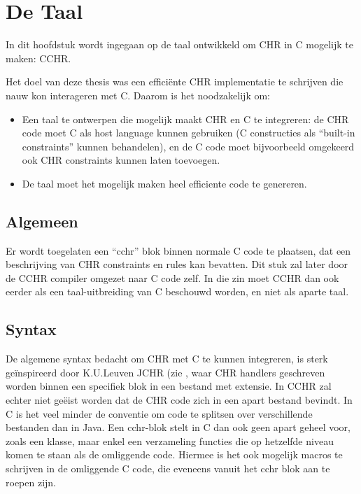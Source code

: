 \chapter{De Taal} \label{chap:taal}

In dit hoofdstuk wordt ingegaan op de taal ontwikkeld om CHR in C mogelijk te maken: CCHR.

Het doel van deze thesis was een effici\"ente CHR implementatie te schrijven die nauw kon interageren met C. Daarom is het noodzakelijk om: \begin{itemize}
  \item Een taal te ontwerpen die mogelijk maakt CHR en C te integreren: de CHR code moet C
        als host language kunnen gebruiken (C constructies als ``built-in constraints'' kunnen
	behandelen), en de C code moet bijvoorbeeld omgekeerd ook CHR constraints kunnen laten toevoegen.
  \item De taal moet het mogelijk maken heel efficiente code te genereren.
\end{itemize}

\section{Algemeen} \label{sec:taal-gen}

Er wordt toegelaten een ``cchr'' blok binnen normale C code te plaatsen, dat een beschrijving van CHR constraints en rules kan bevatten. Dit stuk zal later door de CCHR compiler omgezet naar C code zelf. In die zin moet CCHR dan ook eerder als een taal-uitbreiding van C beschouwd worden, en niet als aparte taal. 

\section{Syntax} \label{sec:taal-syn}

De algemene syntax bedacht om CHR met C te kunnen integreren, is sterk ge\"inspireerd door K.U.Leuven JCHR (zie \cite{peter:jchr}, waar CHR handlers geschreven worden binnen een specifiek blok in een bestand met  extensie. In CCHR zal echter niet ge\"eist worden dat de CHR code zich in een apart bestand bevindt. In C is het veel minder de conventie om code te splitsen over verschillende bestanden dan in Java. Een cchr-blok stelt in C dan ook geen apart geheel voor, zoals een klasse, maar enkel een verzameling functies die op hetzelfde niveau komen te staan als de omliggende code. Hiermee is het ook mogelijk macros te schrijven in de omliggende C code, die eveneens vanuit het cchr blok aan te roepen zijn.

